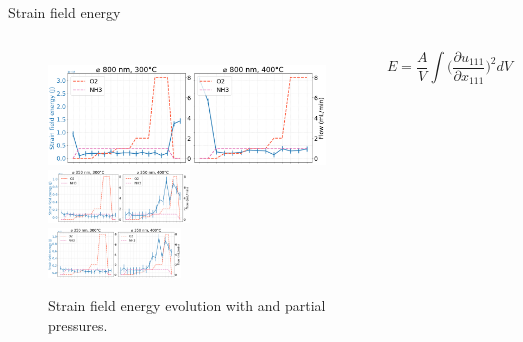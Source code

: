 \begin{frame}{Strain field energy}

    \begin{columns}

        \begin{figure}
            \centering
            \includegraphics[width=\textwidth]{Figures/bcdi_data/D6/strain_energy_D-6.png}
            {\includegraphics[width=0.51\textwidth, clip=True, trim=0 0 19.5cm 0]{Figures/bcdi_data/B7/strain_energy_B-7.png} }\hspace{-0.15cm}
            {\includegraphics[width=0.48\textwidth, clip=True, trim=20.9cm 0 0 0]{Figures/bcdi_data/B7/strain_energy_B-7.png}}
            \caption{Strain field energy evolution with \ammonia and \dioxygen partial pressures.}
        \end{figure}

        \begin{flushleft}
        \begin{equation*}
            E = \frac{A}{V} \int \Big( \frac{\partial u_{111}}{\partial x_{111}} \Big)^2dV %
        \end{equation*}
        \end{flushleft}
        
        \centering
        {}
        {}

    \end{columns}
    
\end{frame}